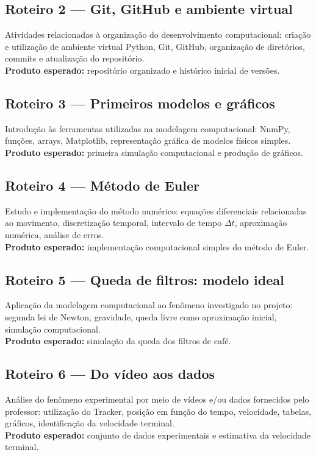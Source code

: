 \documentclass[11pt,a4paper]{article}
\begin{document}
\subsection*{Roteiro 2 --- Git, GitHub e ambiente virtual}
Atividades relacionadas à organização do desenvolvimento computacional: criação e utilização de ambiente virtual Python, Git, GitHub, organização de diretórios, commits e atualização do repositório.\\
\textbf{Produto esperado:} repositório organizado e histórico inicial de versões.

\subsection*{Roteiro 3 --- Primeiros modelos e gráficos}
Introdução às ferramentas utilizadas na modelagem computacional: NumPy, funções, arrays, Matplotlib, representação gráfica de modelos físicos simples.\\
\textbf{Produto esperado:} primeira simulação computacional e produção de gráficos.

\subsection*{Roteiro 4 --- Método de Euler}
Estudo e implementação do método numérico: equações diferenciais relacionadas ao movimento, discretização temporal, intervalo de tempo $\Delta t$, aproximação numérica, análise de erros.\\
\textbf{Produto esperado:} implementação computacional simples do método de Euler.

\subsection*{Roteiro 5 --- Queda de filtros: modelo ideal}
Aplicação da modelagem computacional ao fenômeno investigado no projeto: segunda lei de Newton, gravidade, queda livre como aproximação inicial, simulação computacional.\\
\textbf{Produto esperado:} simulação da queda dos filtros de café.

\subsection*{Roteiro 6 --- Do vídeo aos dados}
Análise do fenômeno experimental por meio de vídeos e/ou dados fornecidos pelo professor: utilização do Tracker, posição em função do tempo, velocidade, tabelas, gráficos, identificação da velocidade terminal.\\
\textbf{Produto esperado:} conjunto de dados experimentais e estimativa da velocidade terminal.
\end{document}
